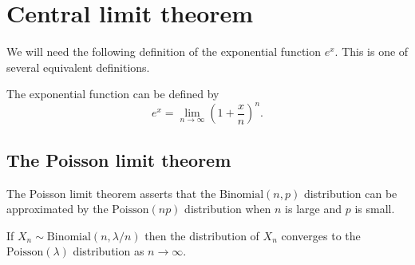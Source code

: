 
\section{Central limit theorem}\label{sec:clt}

We will need the following definition of the exponential function $e^x$. This is one of several equivalent definitions.
\begin{definition}\label{def:compound_interest_formula}
The exponential function can be defined by
\[
e^x = \lim_{n\to\infty}\left(1+\frac{x}{n}\right)^{n}.
\]
\end{definition}


\subsection{The Poisson limit theorem}

The Poisson limit theorem asserts that the $\text{Binomial}(n,p)$ distribution can be approximated by the $\text{Poisson}(np)$ distribution when $n$ is large and $p$ is small.

\begin{theorem}
If $X_n\sim\text{Binomial}(n,\lambda/n)$ then the distribution of $X_n$ converges to the $\text{Poisson}(\lambda)$ distribution as $n\to\infty$.
\end{theorem}

